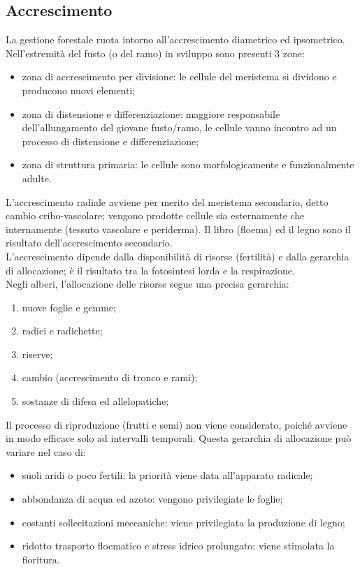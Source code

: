\documentclass{article}
\begin{document}
\subsection{Accrescimento}
La gestione forestale ruota intorno all'accrescimento diametrico ed ipsometrico.\\
Nell'estremità del fusto (o del ramo) in sviluppo sono presenti 3 zone: 
\begin{itemize}
    \item zona di accrescimento per divisione: le cellule del meristema si dividono e producono nuovi elementi; 
    \item zona di distensione e differenziazione: maggiore responsabile dell'allungamento del giovane fusto/ramo, le cellule vanno incontro ad un processo di distensione e differenziazione;
    \item zona di struttura primaria: le cellule sono morfologicamente e funzionalmente adulte. 
\end{itemize}
L'accrescimento radiale avviene per merito del meristema secondario, detto cambio cribo-vascolare; vengono prodotte cellule sia esternamente che internamente (tessuto vascolare e periderma). Il libro (floema) ed il legno sono il risultato dell'accrescimento secondario.\\
L'accrescimento dipende dalla disponibilità di risorse (fertilità) e dalla gerarchia di allocazione; è il risultato tra la fotosintesi lorda e la respirazione.\\
Negli alberi, l'allocazione delle risorse segue una precisa gerarchia: 
\begin{enumerate}
    \item nuove foglie e gemme;
    \item radici e radichette;
    \item riserve;
    \item cambio (accrescimento di tronco e rami); 
    \item sostanze di difesa ed allelopatiche;
\end{enumerate}
Il processo di riproduzione (frutti e semi) non viene considerato, poiché avviene in modo efficace solo ad intervalli temporali.
Questa gerarchia di allocazione può variare nel caso di:
\begin{itemize}
    \item suoli aridi o poco fertili: la priorità viene data all'apparato radicale;
    \item abbondanza di acqua ed azoto: vengono privilegiate le foglie;
    \item costanti sollecitazioni meccaniche: viene privilegiata la produzione di legno;
    \item ridotto trasporto floematico e stress idrico prolungato: viene stimolata la fioritura. 
\end{itemize}
\end{document}

